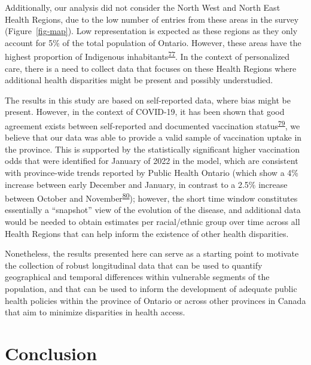 \documentclass[
]{article}
\begin{document}
Additionally, our analysis did not consider the North West and North
East Health Regions, due to the low number of entries from these areas
in the survey (Figure~\ref{fig-map}). Low representation is expected as
these regions as they only account for 5\% of the total population of
Ontario. However, these areas have the highest proportion of Indigenous
inhabitants\textsuperscript{\protect\hyperlink{ref-ontariohealth}{77}}.
In the context of personalized care, there is a need to collect data
that focuses on these Health Regions where additional health disparities
might be present and possibly understudied.

The results in this study are based on self-reported data, where bias
might be present. However, in the context of COVID-19, it has been shown
that good agreement exists between self-reported and documented
vaccination
status\textsuperscript{\protect\hyperlink{ref-stephenson2022}{79}}, we
believe that our data was able to provide a valid sample of vaccination
uptake in the province. This is supported by the statistically
significant higher vaccination odds that were identified for January of
2022 in the model, which are consistent with province-wide trends
reported by Public Health Ontario (which show a 4\% increase between
early December and January, in contrast to a 2.5\% increase between
October and
November\textsuperscript{\protect\hyperlink{ref-ontario-covid}{80}});
however, the short time window constitutes essentially a ``snapshot''
view of the evolution of the disease, and additional data would be
needed to obtain estimates per racial/ethnic group over time across all
Health Regions that can help inform the existence of other health
disparities.

Nonetheless, the results presented here can serve as a starting point to
motivate the collection of robust longitudinal data that can be used to
quantify geographical and temporal differences within vulnerable
segments of the population, and that can be used to inform the
development of adequate public health policies within the province of
Ontario or across other provinces in Canada that aim to minimize
disparities in health access.

\hypertarget{conclusion}{%
\section{Conclusion}\label{conclusion}}
\end{document}
